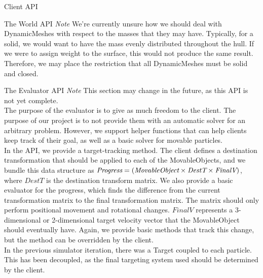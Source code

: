 \documentclass[11pt]{article}
\begin{document}
\begin{section}{Client API}
\begin{subsection}{The World API}
\emph{Note} We're currently unsure how we should deal with DynamicMeshes with respect to the masses that they may have. Typically, for a solid, we would want to have the mass evenly distributed throughout the hull. If we were to assign weight to the surface, this would not produce the same result. Therefore, we may place the restriction that all DynamicMeshes must be solid and closed. 

\end{subsection}

\begin{subsection}{The Evaluator API}
\emph{Note} This section may change in the future, as this API is not yet complete.\\

The purpose of the evaluator is to give as much freedom to the client. The purpose of our project is to not provide them with an automatic solver for an arbitrary problem. However, we support helper functions that can help clients keep track of their goal, as well as a basic solver for movable particles.\\

In the API, we provide a target-tracking method. The client defines a destination transformation that should be applied to each of the MovableObjects, and we bundle this data structure as $\emph{Progress} = (\emph{MovableObject} \times \emph{DestT}\times\emph{FinalV})$, where $DestT$ is the destination transform matrix. We also provide a basic evaluator for the progress, which finds the difference from the current transformation matrix to the final transformation matrix. The matrix should only perform positional movement and rotational changes. $FinalV$ represents a 3-dimensional or 2-dimensional target velocity vector that the MovableObject should eventually have. Again, we provide basic methods that track this change, but the method can be overridden by the client.\\

In the previous simulator iteration, there was a Target coupled to each particle. This has been decoupled, as the final targeting system used should be determined by the client. \\


\end{subsection}
\end{section}
\end{document}
